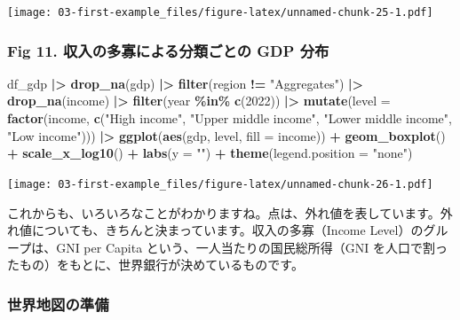 \documentclass[
  xelatex, ja=standard]{bxjsbook}
\newenvironment{Shaded}{\begin{snugshade}}{\end{snugshade}}
\newcommand{\AttributeTok}[1]{\textcolor[rgb]{0.13,0.29,0.53}{#1}}
\newcommand{\DecValTok}[1]{\textcolor[rgb]{0.00,0.00,0.81}{#1}}
\newcommand{\FunctionTok}[1]{\textcolor[rgb]{0.13,0.29,0.53}{\textbf{#1}}}
\newcommand{\NormalTok}[1]{#1}
\newcommand{\SpecialCharTok}[1]{\textcolor[rgb]{0.81,0.36,0.00}{\textbf{#1}}}
\newcommand{\StringTok}[1]{\textcolor[rgb]{0.31,0.60,0.02}{#1}}
\theoremstyle{definition}
\theoremstyle{definition}
\theoremstyle{definition}
\theoremstyle{definition}
\theoremstyle{remark}
\begin{document}
\texttt{[image: 03-first-example\_files/figure-latex/unnamed-chunk-25-1.pdf]}

\hypertarget{fig-11.-ux53ceux5165ux306eux591aux5be1ux306bux3088ux308bux5206ux985eux3054ux3068ux306e-gdp-ux5206ux5e03}{%
\subsubsection{Fig 11. 収入の多寡による分類ごとの GDP 分布}\label{fig-11.-ux53ceux5165ux306eux591aux5be1ux306bux3088ux308bux5206ux985eux3054ux3068ux306e-gdp-ux5206ux5e03}}

\begin{Shaded}
\begin{Highlighting}[]
\NormalTok{df\_gdp }\SpecialCharTok{|\textgreater{}} \FunctionTok{drop\_na}\NormalTok{(gdp) }\SpecialCharTok{|\textgreater{}} \FunctionTok{filter}\NormalTok{(region }\SpecialCharTok{!=} \StringTok{"Aggregates"}\NormalTok{) }\SpecialCharTok{|\textgreater{}}
  \FunctionTok{drop\_na}\NormalTok{(income) }\SpecialCharTok{|\textgreater{}} \FunctionTok{filter}\NormalTok{(year }\SpecialCharTok{\%in\%} \FunctionTok{c}\NormalTok{(}\DecValTok{2022}\NormalTok{)) }\SpecialCharTok{|\textgreater{}}
  \FunctionTok{mutate}\NormalTok{(}\AttributeTok{level =} \FunctionTok{factor}\NormalTok{(income, }\FunctionTok{c}\NormalTok{(}\StringTok{"High income"}\NormalTok{, }\StringTok{"Upper middle income"}\NormalTok{, }\StringTok{"Lower middle income"}\NormalTok{, }\StringTok{"Low income"}\NormalTok{))) }\SpecialCharTok{|\textgreater{}}
  \FunctionTok{ggplot}\NormalTok{(}\FunctionTok{aes}\NormalTok{(gdp, level, }\AttributeTok{fill =}\NormalTok{ income)) }\SpecialCharTok{+} 
  \FunctionTok{geom\_boxplot}\NormalTok{() }\SpecialCharTok{+} \FunctionTok{scale\_x\_log10}\NormalTok{() }\SpecialCharTok{+} \FunctionTok{labs}\NormalTok{(}\AttributeTok{y =} \StringTok{""}\NormalTok{) }\SpecialCharTok{+} 
  \FunctionTok{theme}\NormalTok{(}\AttributeTok{legend.position =} \StringTok{"none"}\NormalTok{)}
\end{Highlighting}
\end{Shaded}

\texttt{[image: 03-first-example\_files/figure-latex/unnamed-chunk-26-1.pdf]}

これからも、いろいろなことがわかりますね。点は、外れ値を表しています。外れ値についても、きちんと決まっています。収入の多寡（Income Level）のグループは、GNI per Capita という、一人当たりの国民総所得（GNI を人口で割ったもの）をもとに、世界銀行が決めているものです。

\hypertarget{ux4e16ux754cux5730ux56f3ux306eux6e96ux5099}{%
\subsubsection{世界地図の準備}\label{ux4e16ux754cux5730ux56f3ux306eux6e96ux5099}}
\end{document}
